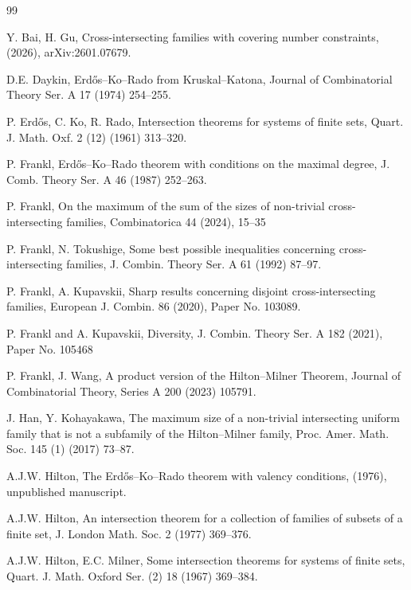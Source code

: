 \documentclass[11pt]{article}
\begin{document}
\fi



\frenchspacing
\begin{thebibliography}{99}

Y. Bai, H. Gu, 
Cross-intersecting families with covering number constraints, (2026), 
arXiv:2601.07679.

 D.E. Daykin, 
 Erd\H{o}s--Ko--Rado from Kruskal--Katona, 
 Journal of Combinatorial Theory Ser. A 17 (1974) 254--255.

P. Erd\H{o}s, C. Ko, R. Rado, 
Intersection theorems for systems of finite sets,
Quart. J. Math. Oxf. 2 (12) (1961) 313--320.

P. Frankl, 
Erd\H{o}s--Ko--Rado theorem with conditions on the maximal degree, 
J. Comb. Theory Ser. A 46 (1987)  252--263.

P. Frankl, 
On the maximum of the sum of the sizes of non-trivial cross-intersecting families, 
Combinatorica 44 (2024), 15--35

P. Frankl, N. Tokushige, 
Some best possible inequalities concerning cross-intersecting families, 
J. Combin. Theory Ser. A 61 (1992) 87--97.

P. Frankl, A. Kupavskii, 
Sharp results concerning disjoint cross-intersecting families, European J. Combin. 86 (2020), Paper No. 103089.

P. Frankl and A. Kupavskii, 
Diversity, 
J. Combin. Theory Ser. A 182 (2021), Paper No. 105468

 P. Frankl, J. Wang, 
 A product version of the Hilton--Milner Theorem,
Journal of Combinatorial Theory, Series A  200 (2023) 105791.
 
 
J. Han, Y. Kohayakawa,
The maximum size of a non-trivial intersecting uniform family
that is not a subfamily of the Hilton--Milner family,
Proc. Amer. Math. Soc. 145 (1) (2017) 73--87.
 
A.J.W. Hilton, 
The Erd\H{o}s--Ko--Rado theorem with valency conditions, 
(1976), unpublished manuscript.
 
 
A.J.W. Hilton, 
An intersection theorem for a collection of families of subsets of a finite set, 
J. London Math. Soc. 2 (1977) 369--376.
 
 
A.J.W. Hilton, E.C. Milner,
Some intersection theorems for systems of finite sets,
Quart. J. Math. Oxford Ser. (2) 18 (1967) 369--384.


\end{thebibliography}
\end{document}

